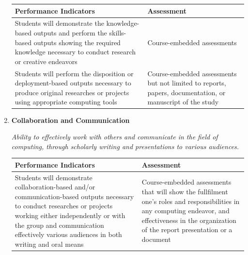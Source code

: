 \documentclass[11pt,a4paper]{article}
\begin{document}
\begin{enumerate}
\begin{tabular}{L{3.5in}L{2in}}
\hline
{\bf Performance Indicators} & {\bf Assessment} \\
\hline
Students will demonstrate the knowledge-based outputs and perform the skills-based outputs showing the required knowledge necessary to conduct research or creative endeavors & Course-embedded assessments\\
Students will perform the disposition or deployment-based outputs necessary to produce original researches or projects using appropriate computing tools & Course-embedded assessments but not limited to reports, papers, documentation, or manuscript of the study\\
\hline
\end{tabular}

\item {\bf Collaboration and Communication}

\textit{Ability to effectively work with others and communicate in the field of computing, through scholarly writing and presentations to various audiences.}

\begin{tabular}{L{3.5in}L{2in}}
\hline
{\bf Performance Indicators} & {\bf Assessment} \\
\hline
Students will demonstrate collaboration-based and/or communication-based outputs necessary to conduct researches or projects working either independently or with the group and communication effectively various audiences in both writing and oral means & Course-embedded assessments that will show the fullfilment one's roles and responsibilities in any computing endeavor, and effectiveness in the organization of the report presentation or a document  \\
\hline
\end{tabular}


\end{enumerate}
\end{document}
